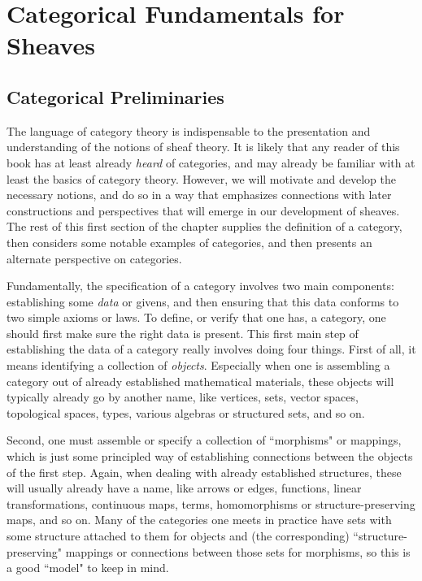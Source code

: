 \documentclass[a4paper]{book}
\theoremstyle{definition}
\theoremstyle{definition}
\theoremstyle{definition}
\theoremstyle{theorem}
\theoremstyle{definition}
\begin{document}
	\chapter{Categorical Fundamentals for Sheaves}
	\section{Categorical Preliminaries}
	The language of category theory is indispensable to the presentation and understanding of the notions of sheaf theory. It is likely that any reader of this book has at least already \textit{heard} of categories, and may already be familiar with at least the basics of category theory. However, we will motivate and develop the necessary notions, and do so in a way that emphasizes connections with later constructions and perspectives that will emerge in our development of sheaves. The rest of this first section of the chapter supplies the definition of a category, then considers some notable examples of categories, and then presents an alternate perspective on categories. \par 
	Fundamentally, the specification of a category involves two main components: establishing some \textit{data} or givens, and then ensuring that this data conforms to two simple axioms or laws. To define, or verify that one has, a category, one should first make sure the right data is present. This first main step of establishing the data of a category really involves doing four things. First of all, it means identifying a collection of \textit{objects}. Especially when one is assembling a category out of already established mathematical materials, these objects will typically already go by another name, like vertices, sets, vector spaces, topological spaces, types, various algebras or structured sets, and so on. \par 
	Second, one must assemble or specify a collection of ``morphisms" or mappings, which is just some principled way of establishing connections between the objects of the first step. Again, when dealing with already established structures, these will usually already have a name, like arrows or edges, functions, linear transformations, continuous maps, terms, homomorphisms or structure-preserving maps, and so on. Many of the categories one meets in practice have sets with some structure attached to them for objects and (the corresponding) ``structure-preserving" mappings or connections between those sets for morphisms, so this is a good ``model" to keep in mind. \par 
\end{document}
